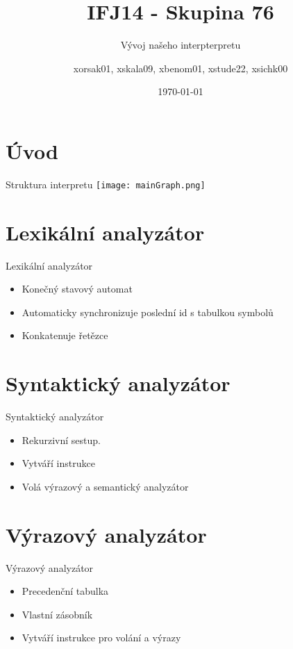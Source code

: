 \documentclass{beamer}
\title{ IFJ14 - Skupina 76 }
\subtitle{Vývoj našeho interpterpretu}
\author{xorsak01, xskala09, xbenom01, xstude22, xsichk00 }
\institute[VUTBR]
{
{\Large Vysoké učení technické v Brně}\\
{\large Fakulta informačních technologií}
}
\date{\today}
\newenvironment{fitbox}[1]
  {\begin{beamerboxesrounded}[upper=upper,shadow=true]
  {#1}}
  {\end{beamerboxesrounded}}
\begin{document}
\begin{frame}
\titlepage
\end{frame}

\section{Úvod}
\begin{frame}
\begin{fitbox}{Struktura interpretu}
	\texttt{[image: mainGraph.png]}
\end{fitbox}
\end{frame}


\section{Lexikální analyzátor}
\begin{frame}
\begin{fitbox}{Lexikální analyzátor}
\begin{itemize}
	\item Konečný stavový automat
	\item Automaticky synchronizuje poslední id s tabulkou symbolů
	\item Konkatenuje řetězce
\end{itemize}
\end{fitbox}
\end{frame}


\section{Syntaktický analyzátor}
\begin{frame}
\begin{fitbox}{Syntaktický analyzátor}
\begin{itemize}
	\item Rekurzivní sestup.
	\item Vytváří instrukce
	\item Volá výrazový a semantický analyzátor 
\end{itemize}
\end{fitbox}

\end{frame}


\section{Výrazový analyzátor}
\begin{frame}
\begin{fitbox}{Výrazový analyzátor}
\begin{itemize}
	\item Precedenční tabulka
	\item Vlastní zásobník
	\item Vytváří instrukce pro volání a výrazy
\end{itemize}
\end{fitbox}

\end{frame}
\end{document}
